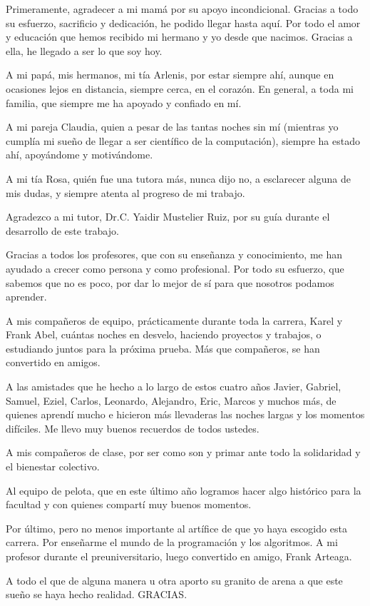 \begin{acknowledgements}
    Primeramente, agradecer a mi mamá por su apoyo incondicional. Gracias a todo su esfuerzo, sacrificio y dedicación, he podido llegar hasta aquí. Por todo el amor y educación que hemos recibido mi hermano y yo desde que nacimos. Gracias a ella, he llegado a ser lo que soy hoy. 

    A mi papá, mis hermanos, mi tía Arlenis, por estar siempre ahí, aunque en ocasiones lejos en distancia, siempre cerca, en el corazón. En general, a toda mi familia, que siempre me ha apoyado y confiado en mí.

    A mi pareja Claudia, quien a pesar de las tantas noches sin mí (mientras yo cumplía mi sueño de llegar a ser científico de la computación), siempre ha estado ahí, apoyándome y motivándome.

    A mi tía Rosa, quién fue una tutora más, nunca dijo no, a esclarecer alguna de mis dudas, y siempre atenta al progreso de mi trabajo.

    Agradezco a mi tutor, Dr.C. Yaidir Mustelier Ruiz, por su guía durante el desarrollo de este trabajo.

    Gracias a todos los profesores, que con su enseñanza y conocimiento, me han ayudado a crecer como persona y como profesional. Por todo su esfuerzo, que sabemos que no es poco, por dar lo mejor de sí para que nosotros podamos aprender.

    A mis compañeros de equipo, prácticamente durante toda la carrera, Karel y Frank Abel, cuántas noches
    en desvelo, haciendo proyectos y trabajos, o estudiando juntos para la próxima prueba. Más que compañeros, se han convertido en amigos.

    A las amistades que he hecho a lo largo de estos cuatro años Javier, Gabriel, Samuel, Eziel, Carlos, Leonardo, Alejandro, Eric, Marcos y muchos más, de quienes aprendí mucho e hicieron más llevaderas las noches largas y los momentos difíciles. Me llevo muy buenos recuerdos de todos ustedes.

    A mis compañeros de clase, por ser como son y primar ante todo la solidaridad y el bienestar colectivo.

    Al equipo de pelota, que en este último año logramos hacer algo histórico para la facultad y con quienes compartí muy buenos momentos.

    Por último, pero no menos importante al artífice de que yo haya escogido esta carrera. Por enseñarme el
    mundo de la programación y los algoritmos. A mi profesor durante el preuniversitario, luego convertido en amigo, Frank Arteaga.

    A todo el que de alguna manera u otra aporto su granito de arena a que este sueño se haya hecho realidad. GRACIAS.

\end{acknowledgements}